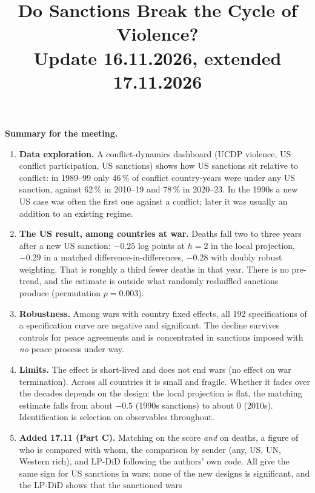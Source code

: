 \documentclass[11pt,a4paper]{article}
\title{Do Sanctions Break the Cycle of Violence?\\[4pt]
\normalsize Update 16.11.2026, extended 17.11.2026}
\author{}
\date{}
\begin{document}
\maketitle
\onehalfspacing

\begin{mdframed}[linewidth=0.6pt,innerleftmargin=10pt,innerrightmargin=10pt]
\textbf{Summary for the meeting.}
\begin{enumerate}[leftmargin=*]
\item \textbf{Data exploration.} A conflict-dynamics dashboard (UCDP violence, US conflict participation, US sanctions)
  shows how US sanctions sit relative to conflict: in 1989--99 only 46\,\% of conflict country-years were under any US
  sanction, against 62\,\% in 2010--19 and 78\,\% in 2020--23. In the 1990s a new US case was often the first one
  against a conflict; later it was usually an addition to an existing regime.
\item \textbf{The US result, among countries at war.} Deaths fall two to three years after a new US sanction:
  $-0.25$ log points at $h=2$ in the local projection, $-0.29$ in a matched difference-in-differences, $-0.28$ with
  doubly robust weighting. That is roughly a third fewer deaths in that year. There is no pre-trend, and the estimate is
  outside what randomly reshuffled sanctions produce (permutation $p=0.003$).
\item \textbf{Robustness.} Among wars with country fixed effects, all 192 specifications of a specification curve are
  negative and significant. The decline survives controls for peace agreements and is concentrated in sanctions
  imposed with \emph{no} peace process under way.
\item \textbf{Limits.} The effect is short-lived and does not end wars (no effect on war termination). Across all
  countries it is small and fragile. Whether it fades over the decades depends on the design: the local projection is
  flat, the matching estimate falls from about $-0.5$ (1990s sanctions) to about 0 (2010s). Identification is
  selection on observables throughout.
\item \textbf{Added 17.11 (Part C).} Matching on the score \emph{and} on deaths, a figure of who is compared with whom,
  the comparison by sender (any, US, UN, Western rich), and LP-DiD following the authors' own code. All give the same
  sign for US sanctions in wars; none of the new designs is significant, and the LP-DiD shows that the sanctioned wars

\end{enumerate}
\end{mdframed}
\end{document}

